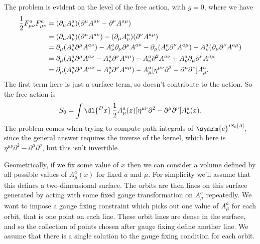 \documentclass[fleqn]{NotesClass}
\newcommand{\e}{\symrm{e}}
\newcommand{\dalembertian}{\partial^2}
\newcommand{\minkowskiMetric}{\eta}
\begin{document}
    The problem is evident on the level of the free action, with \(g = 0\), where we have
    \begin{align}
        \frac{1}{2}F^a_{\mu\nu}F^a_{\mu\nu} &= (\partial_\mu A^a_\nu)(\partial^\mu A^{a\nu} - \partial^\nu A^{a\mu})\\
        &= (\partial_\mu A^a_\nu)(\partial^\mu A^{a\nu}) - (\partial_\mu A^a_\nu)(\partial^\nu A^{a\mu})\\
        &= \partial_\mu (A^a_\nu \partial^\mu A^{a\nu}) - A^a_\nu \partial_\mu \partial^\mu A^{a\nu} - \partial_\mu(A^a_\nu \partial^\nu A^{a\mu}) + A^a_\nu(\partial_\mu \partial^\nu A^{a\mu}) \notag\\
        &= \partial_\mu(A^a_\nu \partial^\mu A^{a\nu} - A^a_\nu \partial^\nu A^{a\mu}) - A^a_\nu \dalembertian A^{a\nu} + A^a_\nu \partial_\mu \partial^\nu A^{a\mu}\\
        &= \partial_\mu(A^a_\nu \partial^\mu A^{a\nu} - A^a_\nu \partial^\nu A^{a\mu}) - A^a_\mu [\minkowskiMetric^{\mu\nu}\dalembertian - \partial^\mu \partial^\nu] A^a_\mu.
    \end{align}
    The first term here is just a surface term, so doesn't contribute to the action.
    So the free action is
    \begin{equation}
        S_0 = \int \dl{^Dx} \, \frac{1}{2}A^a_\mu(x)[\minkowskiMetric^{\mu\nu}\dalembertian - \partial^\mu \partial^\nu] A^a_\nu(x).
    \end{equation}
    The problem comes when trying to compute path integrals of \(\e^{iS_0[A]}\), since the general answer requires the inverse of the kernel, which here is \(\minkowskiMetric^{\mu\nu}\dalembertian - \partial^\mu\partial^\nu\), but this isn't invertible.
    
    Geometrically, if we fix some value of \(x\) then we can consider a volume defined by all possible values of \(A^a_\mu(x)\) for fixed \(a\) and \(\mu\).
    For simplicity we'll assume that this defines a two-dimensional surface.
    The orbits are then lines on this surface generated by acting with some fixed gauge transformation on \(A^a_\mu\) repeatedly.
    We want to impose a gauge fixing constraint which picks out one value of \(A^a_\mu\) for each orbit, that is one point on each line.
    These orbit lines are dense in the surface, and so the collection of points chosen after gauge fixing define another line.
    We assume that there is a single solution to the gauge fixing condition for each orbit.
    
\end{document}
